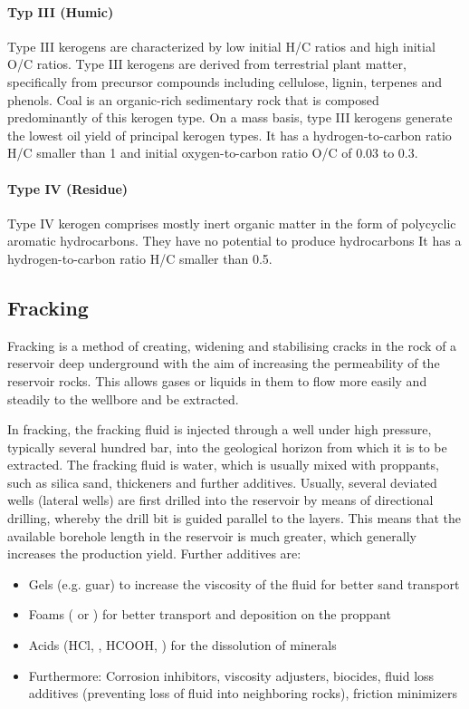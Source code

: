 \paragraph{Typ III (Humic)}
Type III kerogens are characterized by low initial H/C ratios and high initial O/C ratios.
Type III kerogens are derived from terrestrial plant matter, specifically from precursor compounds including cellulose, lignin, terpenes and phenols.
Coal is an organic-rich sedimentary rock that is composed predominantly of this kerogen type.
On a mass basis, type III kerogens generate the lowest oil yield of principal kerogen types.
It has a hydrogen-to-carbon ratio H/C smaller than 1 and initial oxygen-to-carbon ratio O/C of 0.03 to 0.3.

\paragraph{Type IV (Residue)}
Type IV kerogen comprises mostly inert organic matter in the form of polycyclic aromatic hydrocarbons.
They have no potential to produce hydrocarbons
It has a hydrogen-to-carbon ratio H/C smaller than 0.5.

\subsection{Fracking}
Fracking is a method of creating, widening and stabilising cracks in the rock of a reservoir deep underground with the aim of increasing the permeability of the reservoir rocks.
This allows gases or liquids in them to flow more easily and steadily to the wellbore and be extracted.

In fracking, the fracking fluid is injected through a well under high pressure, typically several hundred bar, into the geological horizon from which it is to be extracted.
The fracking fluid is water, which is usually mixed with proppants, such as silica sand, thickeners and further additives.
Usually, several deviated wells (lateral wells) are first drilled into the reservoir by means of directional drilling, whereby the drill bit is guided parallel to the layers.
This means that the available borehole length in the reservoir is much greater, which generally increases the production yield.
Further additives are:

\begin{itemize}
    \item Gels (e.g. guar) to increase the viscosity of the fluid for better sand transport
    \item Foams ( or ) for better transport and deposition on the proppant
    \item Acids (HCl, , HCOOH, ) for the dissolution of minerals
    \item Furthermore: Corrosion inhibitors, viscosity adjusters, biocides, fluid loss additives (preventing loss of fluid into neighboring rocks), friction minimizers
\end{itemize}

